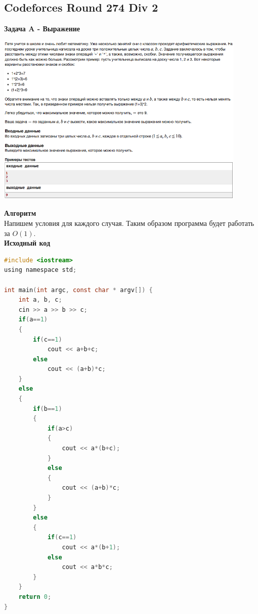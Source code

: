 \documentclass[a4paper,12pt]{article}
\begin{document}
%
%

\newpage
\subsection{Codeforces Round 274 Div 2}

\textbf{{\large Задача A - Выражение}} \\
\begin{center}
\includegraphics[width=0.9\textwidth]{C_274/C_274_A.png}\\ [1cm]
\end{center}
\textbf{{\large Алгоритм}} \\
Напишем условия для каждого случая. Таким образом программа будет работать за $O(1)$.\\

\textbf{{\large Исходный код}}
\begin{lstlisting}[language=C]
#include <iostream>
using namespace std;

int main(int argc, const char * argv[]) {
    int a, b, c;
    cin >> a >> b >> c;
    if(a==1)
    {
        if(c==1)
            cout << a+b+c;
        else
            cout << (a+b)*c;
    }
    else
    {
        if(b==1)
        {
            if(a>c)
            {
                cout << a*(b+c);
            }
            else
            {
                cout << (a+b)*c;
            }
        }
        else
        {
            if(c==1)
                cout << a*(b+1);
            else
                cout << a*b*c;
        }
    }
    return 0;
}
\end{lstlisting}
\end{document}
